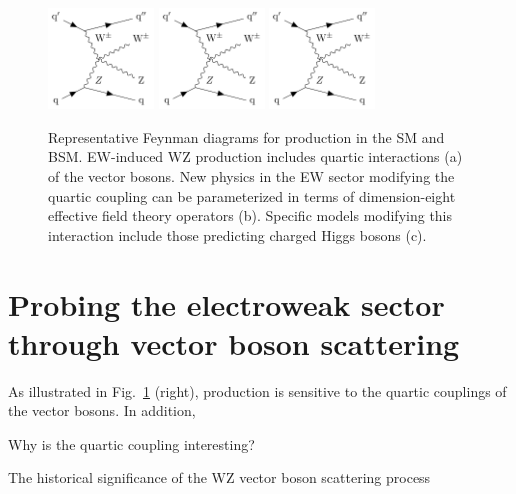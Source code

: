 \begin{figure}[htbp]
  \centering
   \includegraphics[page=1,width=0.25\textwidth]{figures/FeynmanDiagrams/feynmanVBS.pdf}
   \includegraphics[page=2,width=0.25\textwidth]{figures/FeynmanDiagrams/feynmanVBS.pdf}
   \includegraphics[page=3,width=0.25\textwidth]{figures/FeynmanDiagrams/feynmanVBS.pdf}
  \caption{Representative Feynman diagrams for \WZjj production in the SM and BSM. 
  EW-induced WZ production includes quartic interactions (a) of the vector bosons.
  New physics in the EW sector modifying the quartic coupling 
  can be parameterized in terms of dimension-eight effective field theory operators (b).
  Specific models modifying this interaction include those predicting charged Higgs bosons (c).
  }
 \label{fig:feynmanDiagrams}
\end{figure}

\section{Probing the electroweak sector through vector boson scattering}

As illustrated in Fig.~\ref{fig:feynmanDiagrams} (right), \EWWZ production 
is sensitive to the quartic couplings of the vector bosons. In addition,




Why is the quartic coupling interesting?

The historical significance of the WZ vector boson scattering process

